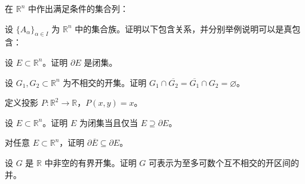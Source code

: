 \noindent\begin{minipage}{\textwidth}
在 $\mathbb R^n$ 中作出满足条件的集合列：
\end{minipage}\par\vfill
\noindent\begin{minipage}{\textwidth}
设 $\{A_\alpha\}_{\alpha\in I}$ 为 $\mathbb R^n$ 中的集合族。证明以下包含关系，并分别举例说明可以是真包含：
\end{minipage}\par\vfill
\newpage
\noindent\begin{minipage}{\textwidth}
设 $E\subset\mathbb R^n$。证明 $\partial E$ 是闭集。
\end{minipage}\par\vfill
\noindent\begin{minipage}{\textwidth}
设 $G_1,G_2\subset\mathbb R^n$ 为不相交的开集。证明 $G_1\cap\overline{G_2}=\overline{G_1}\cap G_2=\varnothing$。
\end{minipage}\par\vfill
\noindent\begin{minipage}{\textwidth}
定义投影 $P:\mathbb R^2\to\mathbb R$，$P(x,y)=x$。
\end{minipage}\par\vfill
\newpage
\noindent\begin{minipage}{\textwidth}
设 $E\subset\mathbb R^n$。证明 $E$ 为闭集当且仅当 $E\supseteq\partial E$。
\end{minipage}\par\vfill
\noindent\begin{minipage}{\textwidth}
对任意 $E\subset\mathbb R^n$，证明 $\partial\overline E\subseteq\partial E$。
\end{minipage}\par\vfill
\noindent\begin{minipage}{\textwidth}
设 $G$ 是 $\mathbb R$ 中非空的有界开集。证明 $G$ 可表示为至多可数个互不相交的开区间的并。
\end{minipage}\par\vfill
